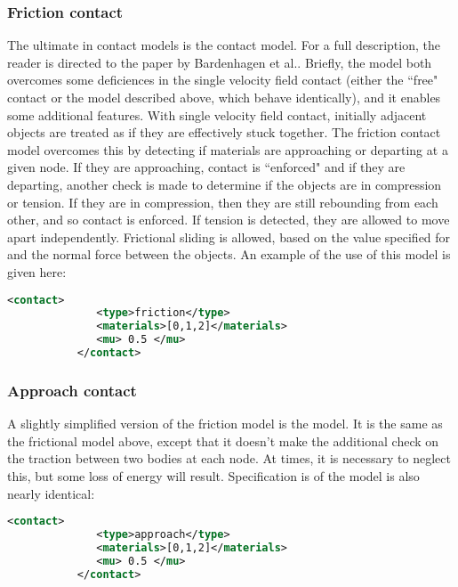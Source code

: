 \subsubsection{Friction contact}
The ultimate in contact models is the  contact 
model.  For a full description, the reader is directed to the paper by
Bardenhagen et al.\cite{Bard2001}.  Briefly, the model both overcomes
some deficiences in the single velocity field contact (either the ``free"
contact or the model described above, which behave identically), and it
enables some additional features.  With single velocity field contact,
initially adjacent objects are treated as if they are effectively stuck
together.  The friction contact model overcomes this by detecting if
materials are approaching or departing at a given node.  If they are
approaching, contact is ``enforced" and if they are departing, another
check is made to determine if the objects are in compression or tension.
If they are in compression, then they are still rebounding from each other,
and so contact is enforced.  If tension is detected, they are allowed
to move apart independently.  Frictional sliding is allowed, based on
the value specified for  and the normal force between
the objects.  An example of the use of this model is given here:

\begin{lstlisting}[language=XML]
           <contact>
              <type>friction</type>
              <materials>[0,1,2]</materials>
              <mu> 0.5 </mu>
           </contact>
\end{lstlisting}

\subsubsection{Approach contact}
A slightly simplified version of the friction model is the
 model.  It is the same as the frictional model
above, except that it doesn't make the additional check on the traction
between two bodies at each node.  At times, it is necessary to neglect this,
but some loss of energy will result.  Specification is of the model is 
also nearly identical:

\begin{lstlisting}[language=XML]
           <contact>
              <type>approach</type>
              <materials>[0,1,2]</materials>
              <mu> 0.5 </mu>
           </contact>
\end{lstlisting}


